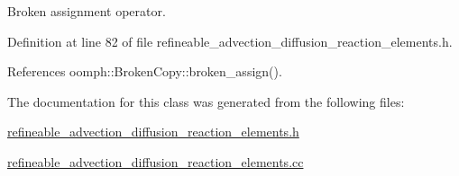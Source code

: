 Broken assignment operator. 



Definition at line 82 of file refineable\+\_\+advection\+\_\+diffusion\+\_\+reaction\+\_\+elements.\+h.



References oomph\+::\+Broken\+Copy\+::broken\+\_\+assign().



The documentation for this class was generated from the following files\+:\begin{DoxyCompactItemize}
\item 
\hyperlink{refineable__advection__diffusion__reaction__elements_8h}{refineable\+\_\+advection\+\_\+diffusion\+\_\+reaction\+\_\+elements.\+h}\item 
\hyperlink{refineable__advection__diffusion__reaction__elements_8cc}{refineable\+\_\+advection\+\_\+diffusion\+\_\+reaction\+\_\+elements.\+cc}\end{DoxyCompactItemize}
